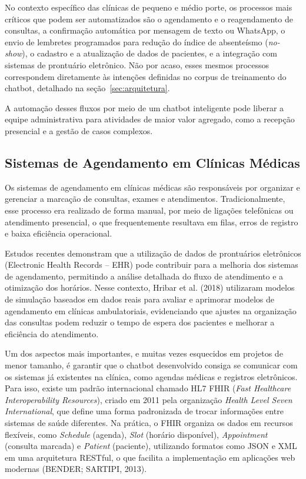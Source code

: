 \documentclass[12pt,a4paper]{extarticle}
\begin{document}
No contexto específico das clínicas de pequeno e médio porte, os processos mais críticos que podem ser automatizados são o agendamento e o reagendamento de consultas, a confirmação automática por mensagem de texto ou WhatsApp, o envio de lembretes programados para redução do índice de absenteísmo (\textit{no-show}), o cadastro e a atualização de dados de pacientes, e a integração com sistemas de prontuário eletrônico. Não por acaso, esses mesmos processos correspondem diretamente às intenções definidas no corpus de treinamento do chatbot, detalhado na seção~\ref{sec:arquitetura}.

A automação desses fluxos por meio de um chatbot inteligente pode liberar a equipe administrativa para atividades de maior valor agregado, como a recepção presencial e a gestão de casos complexos.

\subsection{Sistemas de Agendamento em Clínicas Médicas}
\label{sec:agendamento-clinicas}

Os sistemas de agendamento em clínicas médicas são responsáveis por organizar e gerenciar a marcação de consultas, exames e atendimentos. Tradicionalmente, esse processo era realizado de forma manual, por meio de ligações telefônicas ou atendimento presencial, o que frequentemente resultava em filas, erros de registro e baixa eficiência operacional.

Estudos recentes demonstram que a utilização de dados de prontuários eletrônicos (Electronic Health Records -- EHR) pode contribuir para a melhoria dos sistemas de agendamento, permitindo a análise detalhada do fluxo de atendimento e a otimização dos horários. Nesse contexto, Hribar et al. (2018) utilizaram modelos de simulação baseados em dados reais para avaliar e aprimorar modelos de agendamento em clínicas ambulatoriais, evidenciando que ajustes na organização das consultas podem reduzir o tempo de espera dos pacientes e melhorar a eficiência do atendimento.

Um dos aspectos mais importantes, e muitas vezes esquecidos em projetos de menor tamanho, é garantir que o chatbot desenvolvido consiga se comunicar com os sistemas já existentes na clínica, como agendas médicas e registros eletrônicos. Para isso, existe um padrão internacional chamado HL7 FHIR (\textit{Fast Healthcare Interoperability Resources}), criado em 2011 pela organização \textit{Health Level Seven International}, que define uma forma padronizada de trocar informações entre sistemas de saúde diferentes. Na prática, o FHIR organiza os dados em recursos flexíveis, como \textit{Schedule} (agenda), \textit{Slot} (horário disponível), \textit{Appointment} (consulta marcada) e \textit{Patient} (paciente), utilizando formatos como JSON e XML em uma arquitetura RESTful, o que facilita a implementação em aplicações web modernas (BENDER; SARTIPI, 2013).
\end{document}
